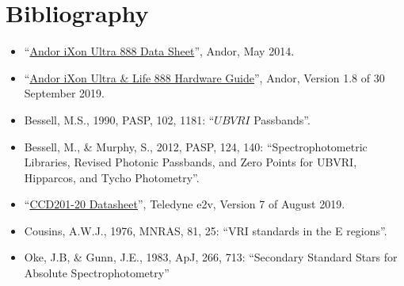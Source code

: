 \section{Bibliography}

\begin{flushleft}
\begin{itemize}
\item “\href{bibliography/huitzi/andor-ixon-ultra-888-data-sheet.pdf}{Andor iXon Ultra 888 Data Sheet}”, Andor, May 2014.
\item “\href{bibliography/huitzi/andor-ixon-ultra-888-hardware-guide.pdf}{Andor iXon Ultra \& Life 888 Hardware Guide}”, Andor, Version 1.8 of 30 September 2019.
\item Bessell, M.S., 1990, PASP, 102, 1181: “$UBVRI$ Passbands”.
\item Bessell, M., \& Murphy, S., 2012,  PASP, 124, 140: “Spectrophotometric Libraries, Revised Photonic Passbands, and Zero Points for UBVRI, Hipparcos, and Tycho Photometry”.
\item “\href{bibliography/huitzi/e2v-ccd201-20-datasheet.pdf}{CCD201-20 Datasheet}”, Teledyne e2v, Version 7 of August 2019.
\item Cousins, A.W.J., 1976, MNRAS, 81, 25: “VRI standards in the E regions”.
\item Oke, J.B, \& Gunn, J.E., 1983, ApJ, 266, 713: “Secondary Standard Stars for Absolute Spectrophotometry”
\end{itemize}
\end{flushleft}



